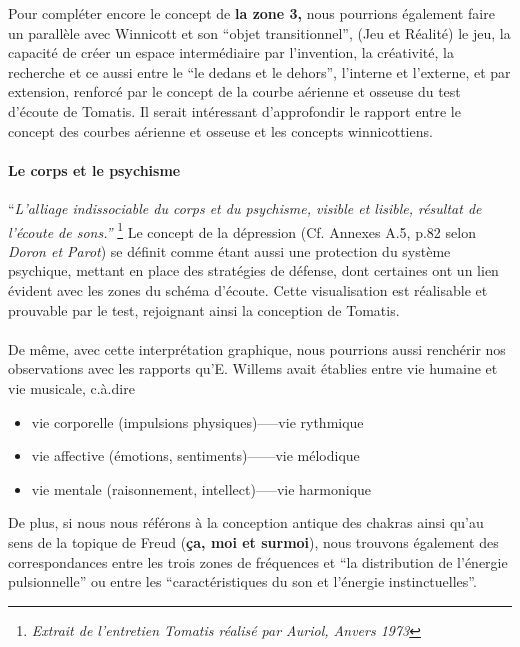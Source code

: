 Pour compléter encore le concept de\textbf{ la zone 3,} nous pourrions
également faire un parallèle avec Winnicott et son ``objet
transitionnel'', (Jeu et Réalité) le jeu, la capacité de créer un espace
intermédiaire par l'invention, la créativité, la recherche et ce aussi entre le ``le
dedans et le
dehors'', l'interne et l'externe,  et par extension, renforcé par le
concept de la courbe
aérienne et osseuse du test d'écoute de Tomatis.
Il serait intéressant d'approfondir le rapport entre le concept des
courbes aérienne et osseuse et les concepts winnicottiens.
\paragraph{Le corps et le psychisme}


``\emph{L'alliage indissociable du corps et du psychisme, 
visible et lisible, résultat de l'écoute de
sons.''} \footnote{\emph{Extrait de l'entretien Tomatis réalisé par
  Auriol, Anvers 1973}}
Le concept de la dépression (Cf. Annexes
A.5, p.82 selon \textit{Doron et
Parot}) se définit comme étant aussi une protection du
système psychique, mettant en place des stratégies de défense,
dont certaines ont un lien évident avec les zones du schéma d'écoute.
Cette visualisation est réalisable et prouvable par le test,
rejoignant ainsi la conception de Tomatis.

\paragraph{}
De même, avec cette interprétation graphique, nous pourrions aussi renchérir nos
observations avec les rapports
qu'E.
Willems  avait établies entre vie humaine et vie musicale, c.à.dire
\begin{itemize}
  \item vie corporelle (impulsions physiques)-----vie rythmique
  \item vie affective (émotions, sentiments)------vie mélodique
    \item vie mentale (raisonnement, intellect)-----vie harmonique
\end{itemize}


De plus, si nous nous référons à la conception antique des chakras ainsi qu'au sens de la
topique de Freud (\textbf{ça, moi et surmoi}), nous trouvons également des correspondances
entre les trois zones de 
fréquences et ``la distribution de l'énergie pulsionnelle'' ou entre
les 
``caractéristiques du son et l'énergie
instinctuelles''\autocite[ch. 13]{auriol_cle_1996}.

